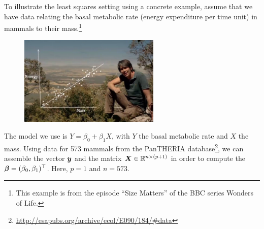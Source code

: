 \begin{example}

To illustrate the least squares setting using a concrete example, assume that we have data relating the basal metabolic rate (energy expenditure per time unit) in mammals to their mass.\footnote{This example is from the episode ``Size Matters'' of the BBC series Wonders of Life.}
\begin{figure}[h!]
\centering
 \includegraphics[width=0.6\textwidth]{images/briancox.png}
\end{figure}
The model we use is $Y=\beta_0+\beta_1X$, with $Y$ the basal metabolic rate and $X$ the mass. Using data for 573 mammals from the PanTHERIA database\footnote{\url{http://esapubs.org/archive/ecol/E090/184/\#data}}, we can assemble the vector $\bm{y}$ and the matrix $\bm{X}\in \mathbb{R}^{n\times (p+1)}$ in order to compute the $\bm{\beta}=(\beta_0,\beta_1)^{\top}$. Here, $p=1$ and $n=573$.


\end{example}
